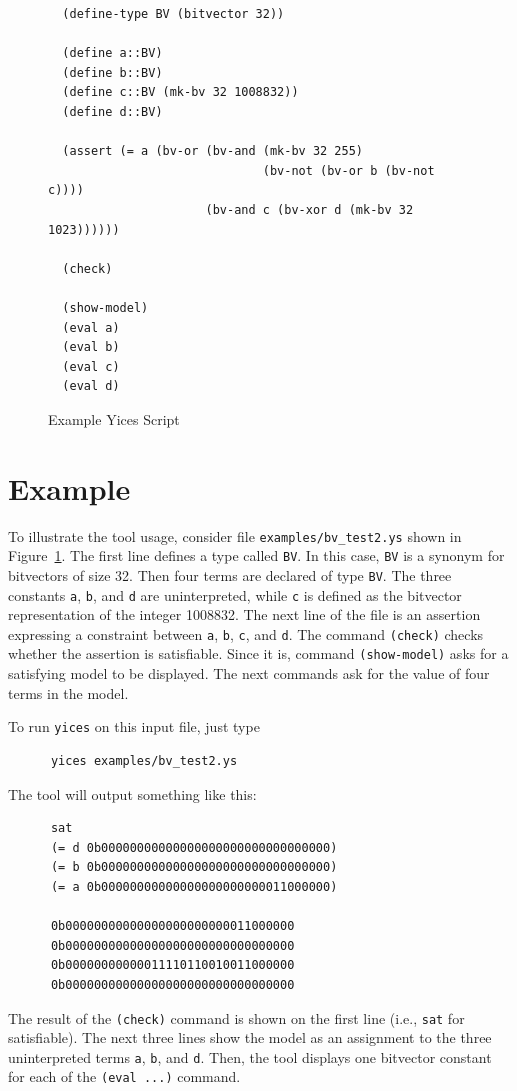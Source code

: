 \documentclass[11pt,twoside,fleqn,openright,titlepage]{cslreport}
\begin{document}
\begin{figure}[ht]
\begin{footnotesize}
\begin{verbatim}
  (define-type BV (bitvector 32))

  (define a::BV)
  (define b::BV)
  (define c::BV (mk-bv 32 1008832))
  (define d::BV)

  (assert (= a (bv-or (bv-and (mk-bv 32 255)
                              (bv-not (bv-or b (bv-not c))))
                      (bv-and c (bv-xor d (mk-bv 32 1023))))))

  (check)

  (show-model)
  (eval a)
  (eval b)
  (eval c)
  (eval d)
\end{verbatim}
\end{footnotesize}
\caption{Example Yices Script}
\label{example:bv_test2}
\end{figure}

\section{Example}

To      illustrate     the      tool     usage,      consider     file
\texttt{examples/bv\_test2.ys} shown in Figure~\ref{example:bv_test2}.
The  first line  defines  a  type called  \texttt{BV}.  In this  case,
\texttt{BV} is  a synonym for bitvectors  of size 32. Then  four terms
are  declared of  type \texttt{BV}.   The three  constants \texttt{a},
\texttt{b},  and \texttt{d}  are  uninterpreted,  while \texttt{c}  is
defined as  the bitvector representation  of the integer  1008832. The
next line of the file is  an assertion expressing a constraint between
\texttt{a},  \texttt{b},  \texttt{c},   and  \texttt{d}.  The  command
\texttt{(check)} checks whether the assertion is satisfiable. Since it
is, command  \texttt{(show-model)} asks for  a satisfying model  to be
displayed. The  next commands ask for  the value of four  terms in the
model.


\medskip\noindent
To run \texttt{yices} on this input file, just type
\begin{small}
\begin{verbatim}
      yices examples/bv_test2.ys
\end{verbatim}
\end{small}
The tool will output something like this:
\begin{small}
\begin{verbatim}
      sat
      (= d 0b00000000000000000000000000000000)
      (= b 0b00000000000000000000000000000000)
      (= a 0b00000000000000000000000011000000)

      0b00000000000000000000000011000000
      0b00000000000000000000000000000000
      0b00000000000011110110010011000000
      0b00000000000000000000000000000000
\end{verbatim}
\end{small}
The result of the \texttt{(check)}  command is shown on the first line
(i.e., \texttt{sat}  for satisfiable). The  next three lines  show the
model as  an assignment to  the three uninterpreted  terms \texttt{a},
\texttt{b},  and \texttt{d}.  Then,  the tool  displays one  bitvector
constant for each of the \texttt{(eval ...)} command.
\end{document}
